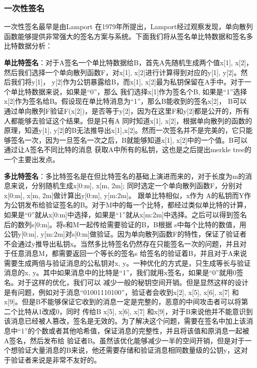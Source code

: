 \subsubsection{一次性签名}
一次性签名最早是由Lamport \cite{diffie1976new}在1979年所提出，Lamport经过观察发现，单向散列函数能够提供非常强大的签名方案与系统。下面我们将从签名单比特数据和签名多比特数据分析：

\textbf{单比特签名}：对于A签名一个单比特数据给B，首先A先随机生成两个值x[1], x[2]，然后我们选择一个单向散列函数F，对x[1], x[2]进行计算得到对应的y[1], y[2]。然后我们将y[1]， y[2]作为公钥暴露给B，而x[1], x[2]最为私钥保留在A手中。对于一个单比特数据来说，如果是“0”，那么
我们选择x[1]作为签名个B, 如果是“1”选择x[2]作为签名给B。假设现在单比特消息为“1”，那么B能收到的签名x[2]， B可以通过单向散列F验证F(x[2])，是否等于y[2]，因为在这里F和y[2]都是公开的，所有人都能够去验证这个结果。但是只有A
同时知道x[1], x[2]，根据单向散列的函数的原理，知道y[1], y[2]的B无法推导出x[1],x[2]。然而一次签名并不是完美的，它只能够签名一次，因为一旦签名一次之后，B就能够知道x[1], x[2]中的一个值。B可以通过让A签名不同比特的消息
获取A中所有的私钥，这也是之后提出merkle tree的一个主要出发点。

\textbf{多比特签名}：多比特签名是在但比特签名的基础上演进而来的，对于长度为m的消息来说，分别随机生成x[0:m], x[m, 2m]; 同时选定一个单向散列函数F，分别对x[0:m], x[m, 2m]做计算出y[0:m], y[m:2m]。 跟单比特相似，x作为
A的私钥而Y作为公钥发布给验证签名的B。对于M中的每一个比特，都经过类似单比特的计算，如果是“0”就从x[0:m]中选择，如果是“1”就从x[m:2m]中选择。之后可以得到签名后的数列s[0:m]。将s和M一起传给需要验证的B，B根据
s中每个比特的数值，用公钥y[0:m], y[m:2m]对s[0:m]做验证。因为单向散列函数F的特性，保证了验证者不会通过y推导出私钥x。当然多比特签名仍然存在只能签名一次的问题，并且对于任意消息M，都需要返回一个等长的签名s
给签名的验证着B，并且对于A来说需要生成两倍与验证消息的公私钥对x, y。一种优化的方式是，只生成等长与验证消息的x, y。其中如果消息中的比特是“1”，我们就用x签名，如果是“0”就用0签名。对于这样的优化，我们可以
减少一般的秘钥空间开销。但是显然这样的设计是有问题，例如对于消息“01001110100”，验证者会收到x[2], x[5], x[6], x[7] 和x[9]。但是B不能够保证它收到的消息一定是完整的，恶意的中间攻击者可以将第二个比特从1改成0，同时
传给B x[5], x[6], x[7] 和x[9]，对于B来说他并不能意识到该消息已经被人篡改，签名是无效的。为了解决这个问题，需要在签名中加上该消息中“1”的个数或者其他哈希值，保证消息的完整性，并且将该值和原消息一起被A签名，然后发布给
验证者B。虽然该优化能够减少一半的空间开销，但是对于一个想验证大量消息的B来说，他还需要存储和验证消息相同数量级的公钥y，这对于验证者来说是非常不友好的。

